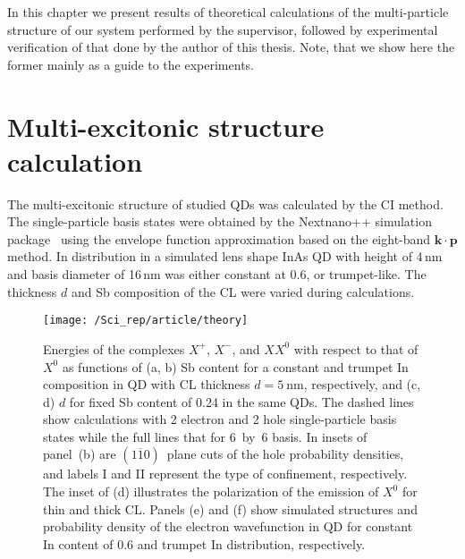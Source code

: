 \medskip
In this chapter we present results of theoretical calculations of the multi-particle structure of our system performed by the supervisor, followed by experimental verification of that done by the author of this thesis. Note, that we show here the former mainly as a guide to the experiments.
\newpage 




\section{Multi-excitonic structure calculation} \label{sec:scirep_theory}
The multi-excitonic structure of studied QDs was calculated by the CI method. The single-particle basis states were obtained by the Nextnano++ simulation package~\citep{next} using the envelope function approximation based on the eight-band $\mathbf{k \cdot p}$ method. In distribution in a simulated lens shape InAs QD with height of 4$\,$nm and basis diameter of 16$\,$nm was either constant at 0.6, or trumpet-like. The thickness $d$ and Sb composition of the CL were varied during calculations. 
%
\begin{figure}
	\centering
	\texttt{[image: /Sci\_rep/article/theory]}
	\caption{Energies of the complexes $X^+$, $X^-$, and $XX^0$ with respect to that of $X^0$ as functions of (a, b) Sb content for a constant and trumpet In composition in QD with CL thickness $d=5~\mathrm{nm}$, respectively, and (c, d) $d$ for fixed Sb content of 0.24 in the same QDs. The dashed lines show calculations with 2 electron and 2 hole single-particle basis states while the full lines that for 6~by~6 basis. In insets of panel~(b) are $(1\overline{1}0)$~plane cuts of the hole probability densities, and labels I and II represent the type of confinement, respectively. The inset of (d) illustrates the polarization of the emission of $X^0$ for thin and thick CL. Panels (e) and (f) show simulated structures and probability density of the electron wavefunction in QD for constant In content of 0.6 and trumpet In distribution, respectively.}
	\label{fig:Sci_rep_theory}
\end{figure}
%

